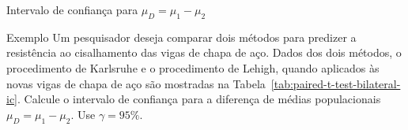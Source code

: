 \documentclass[9pt]{beamer}
\begin{document}
\begin{frame}{Intervalo de confiança para $\mu_D = \mu_1 - \mu_2$}

\begin{block}{Exemplo}
Um pesquisador deseja comparar dois métodos para predizer a resistência ao cisalhamento das vigas de chapa de aço. Dados dos dois métodos, o procedimento de Karlsruhe e o procedimento de Lehigh, quando aplicados às novas vigas de chapa de aço são mostradas na Tabela~\ref{tab:paired-t-test-bilateral-ic}. Calcule o intervalo de confiança para a diferença de médias populacionais $\mu_D = \mu_1 - \mu_2$. Use $\gamma=95\%$.
\end{block}

\begin{table}[ht]
\centering
{}
\caption{Previsões de resistência para nove vigas de chapa de aço.} 
\label{tab:paired-t-test-bilateral-ic}
\end{table}

\end{frame}
\end{document}
